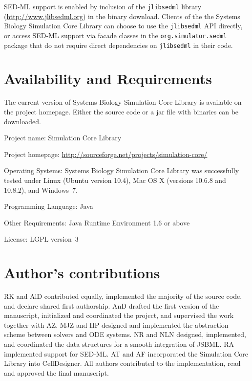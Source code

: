 \documentclass[10pt]{bmc_article}
\newenvironment{bmcformat}{\baselineskip20pt\sloppy\setboolean{publ}{false}}{\baselineskip20pt\sloppy}
\newcommand{\jlibsedml}{\texttt{jlibsedml}}
\begin{document}
\begin{bmcformat}
%
SED-ML support is enabled by inclusion of the \jlibsedml{} library
(\href{http://www.jlibsedml.org}{http://www.jlibsedml.org}) in the binary
download. Clients of the the Systems Biology Simulation Core Library can choose
to use the \jlibsedml{} API directly, or access SED-ML support via  facade
classes in the \texttt{org.simulator.sedml} package that do not require direct
dependencies on \jlibsedml{} in their code.


\section*{Availability and Requirements}
The current version of Systems Biology Simulation Core Library is available on
the project homepage. Either the source code or a jar file with binaries can be
downloaded.

Project name: Simulation Core Library

Project homepage: \url{http://sourceforge.net/projects/simulation-core/}

Operating Systems: Systems Biology Simulation Core Library was successfully 
tested under Linux (Ubuntu version 10.4), Mac OS X (versions 10.6.8 and 10.8.2),
and Windows~7.

Programming Language: Java\texttrademark{}

Other Requirements: Java Runtime Environment 1.6 or above

License: LGPL version~3

\bigskip

\section*{Author's contributions}
RK and AlD contributed equally, implemented the majority of the source code, and
declare shared first authorship.
AnD drafted the first version of the manuscript, initialized and coordinated the
project, and supervised the work together with AZ.
MJZ and HP designed and implemented the abstraction scheme between solvers and
ODE systems.
NR and NLN designed, implemented, and coordinated the data structures for a
smooth integration of JSBML.
RA implemented support for SED-ML.
AT and AF incorporated the Simulation Core Library into CellDesigner.
All authors contributed to the implementation, read and approved the final
manuscript.
    


\end{bmcformat}
\end{document}
